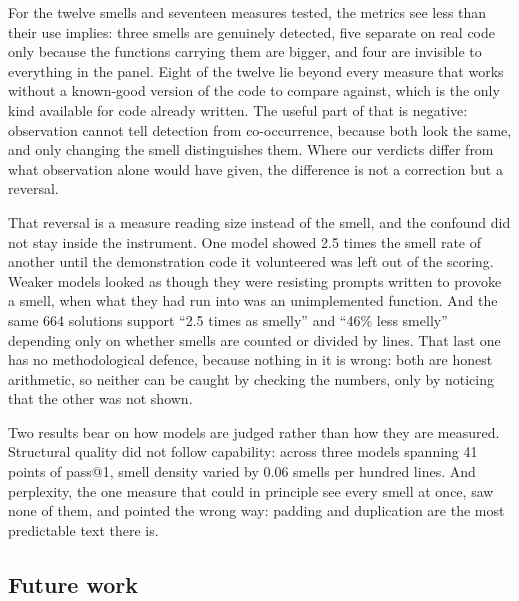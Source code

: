 \documentclass[10pt,a4paper,twocolumn]{article}
\begin{document}
For the twelve smells and seventeen measures tested, the metrics see less than
their use implies: three smells are genuinely detected, five separate on real
code only because the functions carrying them are bigger, and four are invisible
to everything in the panel. Eight of the twelve lie beyond every measure that
works without a known-good version of the code to compare against, which is the
only kind available for code already written. The useful part of that is
negative: observation cannot tell detection from co-occurrence, because both
look the same, and only changing the smell distinguishes them. Where our
verdicts differ from what observation alone would have given, the difference is
not a correction but a reversal.

That reversal is a measure reading size instead of the smell, and the confound
did not stay inside the instrument. One model showed 2.5 times the smell rate of
another until the demonstration code it volunteered was left out of the scoring.
Weaker models looked as though they were resisting prompts written to provoke a
smell, when what they had run into was an unimplemented function. And the same
664 solutions support ``2.5 times as smelly'' and ``46\% less smelly'' depending
only on whether smells are counted or divided by lines. That last one has no
methodological defence, because nothing in it is wrong: both are honest
arithmetic, so neither can be caught by checking the numbers, only by noticing
that the other was not shown.

Two results bear on how models are judged rather than how they are measured.
Structural quality did not follow capability: across three models spanning 41
points of pass@1, smell density varied by 0.06 smells per hundred lines. And
perplexity, the one measure that could in principle see every smell at once, saw
none of them, and pointed the wrong way: padding and duplication are the most
predictable text there is.

\subsection*{Future work}
\end{document}
